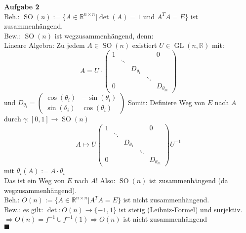 \documentclass{article}
\DeclareMathOperator{\so}{SO}
\DeclareMathOperator{\gl}{GL}
\begin{document}
\textbf{Aufgabe 2}\\
Beh.: $\so(n):=\{A\in\mathbb{R}^{n\times n}|\det(A)=1\text{ und }A^TA=E\}$ ist zusammenhängend.\\
Bew.: $\so(n)$ ist wegzusammenhängend, denn:\\
Lineare Algebra: Zu jedem $A\in\so(n)$ existiert $U\in\gl(n,\mathbb{R})$ mit:
$$A=U\cdot\left(\begin{array}{ccccc}1 & & & & 0\\ & \ddots & & & \\ & & D_{\theta_1} & & \\ & & & \ddots & \\ 0 & & & & D_{\theta_m}\end{array}\right)$$
und $D_{\theta_i}=\left(\begin{array}{cc}\cos(\theta_i) & -\sin(\theta_i) \\ \sin(\theta_i) & \cos(\theta_i)\end{array}\right)$ Somit: Definiere Weg von $E$ nach $A$ durch $\gamma:[0,1]\rightarrow\so(n)$ 
$$A\mapsto U\left(\begin{array}{ccccc}1 & & & & 0 \\ & \ddots & & & \\ & & D_{\theta_1} & & \\ & & & \ddots & \\0 & & & & D_{\theta_m}\end{array}\right)U^{-1}$$ mit $\theta_i(A):=A\cdot\theta_i$\\
Das ist ein Weg von $E$ nach $A$! Also: $\so(n)$ ist zusammenhängend (da wegzusammenhängend).\\
Beh.: $O(n):=\{A\in\mathbb{R}^{n\times n}|A^TA=E\}$ ist nicht zusammenhängend.\\
Bew.: es gilt: $\det:O(n)\rightarrow\{-1,1\}$ ist stetig (Leibniz-Formel) und surjektiv.\\
$\Rightarrow O(n)=f^{-1}\cup f^{-1}(1)\Rightarrow O(n)$ ist nicht zusammenhängend\\
$\blacksquare$\\
\end{document}
